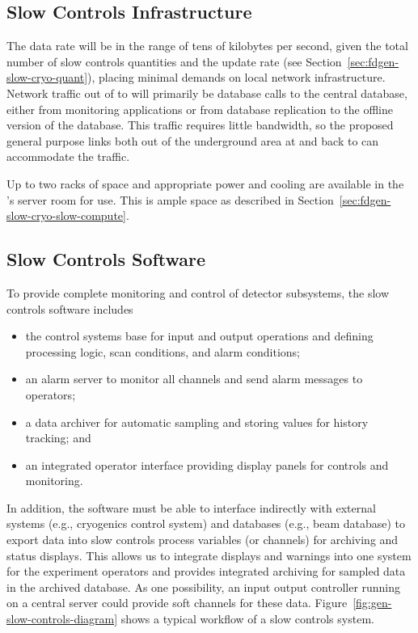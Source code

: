 \subsection{Slow Controls Infrastructure}
\label{sec:fdgen-slow-cryo-slow-infra}

The data rate will be in the range of tens of kilobytes per second, given the total number of slow controls quantities and the update rate  
(see Section~\ref{sec:fdgen-slow-cryo-quant}), placing minimal demands
on local network infrastructure.
Network traffic out of  to  will primarily be database calls
to the central  database, either from monitoring applications or from
database replication to the offline version of the  database.  This
traffic requires little bandwidth, so the proposed general purpose
links both out of the %
underground area at   and back to  can accommodate the traffic.

Up to two racks of space and appropriate power and cooling are
available in the 's  server room for  use. This is ample space as described in Section~\ref{sec:fdgen-slow-cryo-slow-compute}.


\subsection{Slow Controls Software}
\label{sec:fdgen-slow-cryo-sw}

To provide complete monitoring and control of detector subsystems, the slow controls software includes
%
\begin{itemize}
 \item the control systems base for input and output operations
  and defining processing logic, scan conditions, and alarm conditions;
 \item an alarm server to monitor all channels and send alarm
  messages to operators;
 \item a data archiver for automatic sampling and storing values for history tracking; and 
 \item an integrated operator interface providing display panels for
  controls and monitoring.
\end{itemize}

In addition, the software must be able to 
interface indirectly with external systems (e.g., cryogenics control
system) and databases (e.g., beam database) to export data into
slow controls process variables (or channels) for archiving and status
displays. This allows us to integrate displays and warnings into one
system for the experiment operators and %
provides integrated
archiving for sampled data in the archived database. As one possibility, an input output controller running on a central 
server could provide soft channels for these data.
Figure~\ref{fig:gen-slow-controls-diagram} shows a typical workflow of a
slow controls system.


